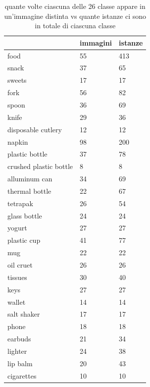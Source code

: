 \documentclass[a4paper, oneside]{book}
\begin{document}
\begin{table}[h!]
    \centering
    \caption{quante volte ciascuna delle 26 classe appare in un'immagine distinta vs quante istanze ci sono in totale di ciascuna classe}
    \label{tab:data}
    \begin{tabular}{|l|l|l|}
        \hline
         & immagini & istanze \\ \hline
        food & 55 & 413 \\ \hline
        snack & 37 & 65 \\ \hline
        sweets & 17 & 17 \\ \hline
        fork & 56 & 82 \\ \hline
        spoon & 36 & 69 \\ \hline
        knife & 29 & 36 \\ \hline
        disposable cutlery & 12 & 12 \\ \hline
        napkin & 98 & 200 \\ \hline
        plastic bottle & 37 & 78 \\ \hline
        crushed plastic bottle & 8 & 8 \\ \hline
        alluminum can & 34 & 69 \\ \hline
        thermal bottle & 22 & 67 \\ \hline
        tetrapak & 26 & 54 \\ \hline
        glass bottle & 24 & 24 \\ \hline
        yogurt & 27 & 27 \\ \hline
        plastic cup & 41 & 77 \\ \hline
        mug & 22 & 22 \\ \hline
        oil cruet & 26 & 26 \\ \hline
        tissues & 30 & 40 \\ \hline
        keys & 27 & 27 \\ \hline
        wallet & 14 & 14 \\ \hline
        salt shaker & 17 & 17 \\ \hline
        phone & 18 & 18 \\ \hline
        earbuds & 21 & 34 \\ \hline
        lighter & 24 & 38 \\ \hline
        lip balm & 20 & 43 \\ \hline
        cigarettes & 10 & 10 \\ \hline
    \end{tabular}
\end{table}
\end{document}
